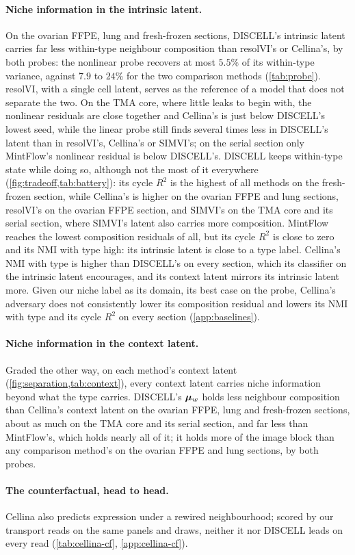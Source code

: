 \paragraph{Niche information in the intrinsic latent.}
 On the ovarian FFPE, lung and fresh-frozen sections, DISCELL's intrinsic latent carries far less within-type neighbour composition than resolVI's or Cellina's, by both probes: the nonlinear probe recovers at most $5.5\%$ of its within-type variance, against $7.9$ to $24\%$ for the two comparison methods (\cref{tab:probe}). resolVI, with a single cell latent, serves as the reference of a model that does not separate the two. On the TMA core, where little leaks to begin with, the nonlinear residuals are close together and Cellina's is just below DISCELL's lowest seed, while the linear probe still finds several times less in DISCELL's latent than in resolVI's, Cellina's or SIMVI's; on the serial section only MintFlow's nonlinear residual is below DISCELL's. DISCELL keeps within-type state while doing so, although not the most of it everywhere (\cref{fig:tradeoff,tab:battery}): its cycle $R^2$ is the highest of all methods on the fresh-frozen section, while Cellina's is higher on the ovarian FFPE and lung sections, resolVI's on the ovarian FFPE section, and SIMVI's on the TMA core and its serial section, where SIMVI's latent also carries more composition. MintFlow reaches the lowest composition residuals of all, but its cycle $R^2$ is close to zero and its NMI with type high: its intrinsic latent is close to a type label. Cellina's NMI with type is higher than DISCELL's on every section, which its classifier on the intrinsic latent encourages, and its context latent mirrors its intrinsic latent more. Given our niche label as its domain, its best case on the probe, Cellina's adversary does not consistently lower its composition residual and lowers its NMI with type and its cycle $R^2$ on every section (\cref{app:baselines}).

\paragraph{Niche information in the context latent.}
Graded the other way, on each method's context latent (\cref{fig:separation,tab:context}), every context latent carries niche information beyond what the type carries. DISCELL's $\boldsymbol{\mu}_w$ holds less neighbour composition than Cellina's context latent on the ovarian FFPE, lung and fresh-frozen sections, about as much on the TMA core and its serial section, and far less than MintFlow's, which holds nearly all of it; it holds more of the image block than any comparison method's on the ovarian FFPE and lung sections, by both probes.

\paragraph{The counterfactual, head to head.}
Cellina also predicts expression under a rewired neighbourhood; scored by our transport reads on the same panels and draws, neither it nor DISCELL leads on every read (\cref{tab:cellina-cf}, \cref{app:cellina-cf}).

